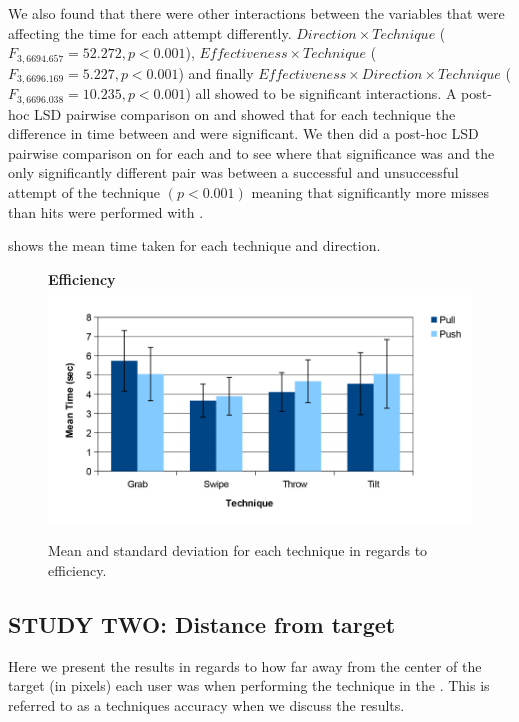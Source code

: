 We also found that there were other interactions between the variables that were affecting the time for each attempt differently. 
$Direction \times Technique$  ($F_{3,6694.657} = 52.272, p < 0.001$), $Effectiveness \times Technique$  ($F_{3,6696.169} = 5.227, p < 0.001$) and finally $Effectiveness \times Direction \times Technique$  ($F_{3,6696.038} = 10.235, p < 0.001$) all showed to be significant interactions. 
A post-hoc LSD pairwise comparison on \direction and \technique showed that for each technique the difference in time between \push and \pull were significant.
We then did a post-hoc LSD pairwise comparison on \effectiveness for each \technique and \direction to see where that significance was and the only significantly different pair was between a successful and unsuccessful attempt of the \grab \pull technique $(p < 0.001)$ meaning that significantly more misses than hits were performed with \grab \pull.

 shows the mean time taken for each technique and direction.

\begin{figure}[H]{
	\centering
	\textbf{Efficiency}\\[4pt]
	\includegraphics[width = 1\columnwidth ]{images/time_graph.pdf}} 
	\caption{
		Mean and standard deviation for each technique in regards to efficiency.
	}
	\label{fig:efficiencyGraph}
\end{figure}

\subsection{STUDY TWO: Distance from target}
Here we present the results in regards to how far away from the center of the target (in pixels) each user was when performing the technique in the \accuracy. 
This is referred to as a techniques accuracy when we discuss the results. 

